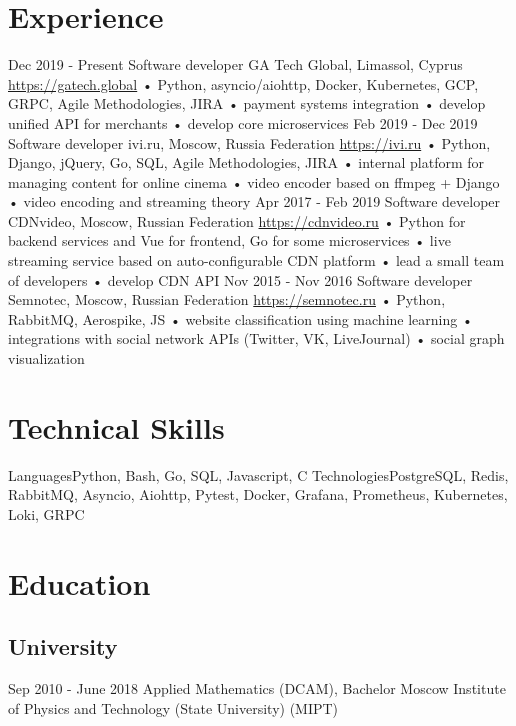 \documentclass[11pt,a4paper]{moderncv}
\begin{document}
\maketitle

\section{Experience}
\cventry
  {Dec 2019 - Present}
  {Software developer}
  {GA Tech Global, Limassol, Cyprus}
  {\newline{}\url{https://gatech.global}}{}
  {
    • Python, asyncio/aiohttp, Docker, Kubernetes, GCP, GRPC, Agile Methodologies, JIRA\newline{}
    • payment systems integration\newline{}
    • develop unified API for merchants\newline{}
    • develop core microservices
  }
\cventry
  {Feb 2019 - Dec 2019}
  {Software developer}
  {ivi.ru, Moscow, Russia Federation}
  {\newline{}\url{https://ivi.ru}}{}
  {
    • Python, Django, jQuery, Go, SQL, Agile Methodologies, JIRA\newline{}
    • internal platform for managing content for online cinema\newline{}
    • video encoder based on ffmpeg + Django\newline{}
    • video encoding and streaming theory
   }
\cventry
  {Apr 2017 - Feb 2019}
  {Software developer}
  {CDNvideo, Moscow, Russian Federation}
  {\newline{}\url{https://cdnvideo.ru}}{}
  {
    • Python for backend services and Vue for frontend, Go for some microservices\newline{}
    • live streaming service based on auto-configurable CDN platform\newline{}
    • lead a small team of developers\newline{}
    • develop CDN API
   }
\cventry
  {Nov 2015 - Nov 2016}
  {Software developer}
  {Semnotec, Moscow, Russian Federation}
  {\newline{}\url{https://semnotec.ru}}{}
  {
    • Python, RabbitMQ, Aerospike, JS\newline{}
    • website classification using machine learning\newline{}
    • integrations with social network APIs (Twitter, VK, LiveJournal)\newline{}
    • social graph visualization
   }

\section{Technical Skills}
\cvline
  {Languages}{Python, Bash, Go, SQL, Javascript, C}
\cvline
  {Technologies}{PostgreSQL, Redis, RabbitMQ, Asyncio, Aiohttp, Pytest,
    Docker, Grafana, Prometheus, Kubernetes, Loki, GRPC}

\section{Education}
  \subsection{University}
  \cventry
    {Sep 2010 - June 2018}
    {Applied Mathematics (DCAM), Bachelor}
    {Moscow Institute of Physics and Technology (State University) (MIPT)}
    {}{}{}
\end{document}
